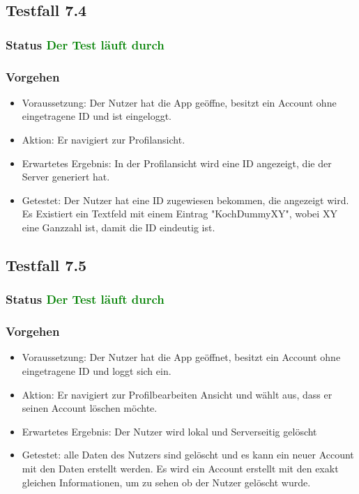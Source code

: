\subsection{Testfall 7.4}
\subsubsection{Status \textcolor{green}{ Der Test läuft durch}} 
\subsubsection{Vorgehen}
\begin{itemize}
\item Voraussetzung: Der Nutzer hat die App geöffne, besitzt ein Account ohne eingetragene ID und ist eingeloggt. 
\item Aktion: Er navigiert zur Profilansicht.
\item Erwartetes Ergebnis: In der Profilansicht wird eine ID angezeigt, die der Server generiert hat. 
\item Getestet: Der Nutzer hat eine ID zugewiesen bekommen, die angezeigt wird. Es Existiert ein Textfeld mit einem Eintrag "KochDummyXY", wobei XY eine Ganzzahl ist, damit die ID eindeutig ist. 
\end{itemize}

\subsection{Testfall 7.5}
\subsubsection{Status \textcolor{green}{ Der Test läuft durch}} 
\subsubsection{Vorgehen}
\begin{itemize}
\item Voraussetzung: Der Nutzer hat die App geöffnet, besitzt ein Account ohne eingetragene ID  und loggt sich ein. 
\item Aktion: Er navigiert zur Profilbearbeiten Ansicht und wählt aus, dass er seinen Account löschen möchte.
\item Erwartetes Ergebnis: Der Nutzer wird lokal und Serverseitig gelöscht 
\item Getestet:  alle Daten des Nutzers sind gelöscht und es kann ein neuer Account mit den Daten erstellt werden. Es wird ein Account erstellt mit den exakt gleichen Informationen, um zu sehen ob der Nutzer gelöscht wurde.  
\end{itemize}


